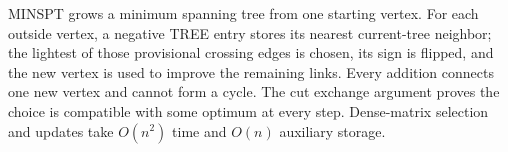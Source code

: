 \documentclass[10pt,letterpaper]{article}
\begin{document}
\begin{tcolorbox}[colback=Ink!4,colframe=Ink,title=Cornell summary]
MINSPT grows a minimum spanning tree from one starting vertex. For each outside vertex, a negative TREE entry stores its nearest current-tree neighbor; the lightest of those provisional crossing edges is chosen, its sign is flipped, and the new vertex is used to improve the remaining links. Every addition connects one new vertex and cannot form a cycle. The cut exchange argument proves the choice is compatible with some optimum at every step. Dense-matrix selection and updates take $O(n^2)$ time and $O(n)$ auxiliary storage.
\end{tcolorbox}
\end{document}
